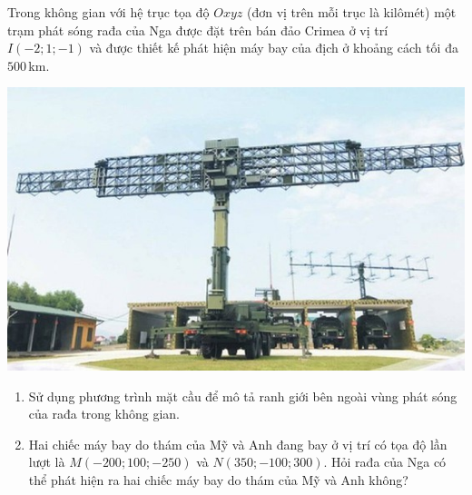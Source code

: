 \begin{bt}%
	Trong không gian với hệ trục tọa độ $Oxyz$ (đơn vị trên mỗi trục là kilômét) một trạm phát sóng rađa của Nga được đặt trên bán đảo Crimea ở vị trí $I(-2;1;-1)$ và được thiết kế phát hiện máy bay của địch ở khoảng cách tối đa $500$\,km.
	\begin{center}
		\includegraphics[scale=0.8]{image/Hinh1_C5B3CD2_2-4}
	\end{center}
	\begin{enumerate}
		\item Sử dụng phương trình mặt cầu để mô tả ranh giới bên ngoài vùng phát sóng của rađa trong không gian.
		\item Hai chiếc máy bay do thám của Mỹ và Anh đang bay ở vị trí có tọa độ lần lượt là $M(-200;100;-250)$ và $N(350;-100;300)$. Hỏi rađa của Nga có thể phát hiện ra hai chiếc máy bay do thám của Mỹ và Anh không?
	\end{enumerate}
\end{bt}

